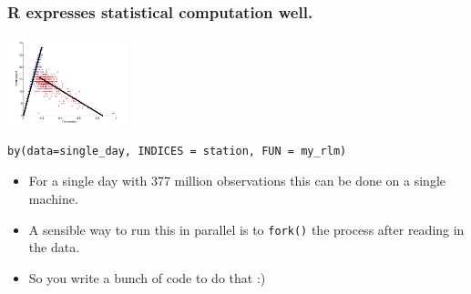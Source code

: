 \documentclass{beamer}
\begin{document}
\begin{frame}[fragile]

    \frametitle{R expresses statistical computation well.}



\centerline{\includegraphics[height=1in]{fundamental_diagram.png}}

\begin{verbatim}
by(data=single_day, INDICES = station, FUN = my_rlm)
\end{verbatim}

    \begin{itemize}
        \item For a single day with 377 million observations this can be
            done on a single machine.
        \item A sensible way to run this in parallel is to \texttt{fork()}
            the process after reading in the data.
        \item So you write a bunch of code to do that :)
    \end{itemize}

\end{frame}
\end{document}
